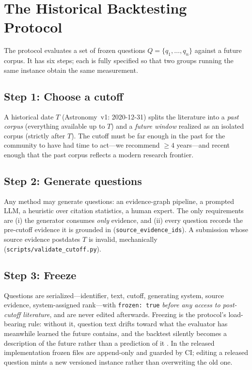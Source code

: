 \section{The Historical Backtesting Protocol}
\label{sec:protocol}

The protocol evaluates a set of frozen questions $Q = \{q_1,\dots,q_n\}$
against a future corpus. It has six steps; each is fully specified so
that two groups running the same instance obtain the same measurement.

\subsection{Step 1: Choose a cutoff}
A historical date $T$ (Astronomy~v1: 2020-12-31) splits the literature
into a \emph{past corpus} \corpusA{} (everything available up to $T$)
and a \emph{future window} realized as an isolated corpus \corpusB{}
(strictly after $T$). The cutoff must be far enough in the past for the
community to have had time to act---we recommend $\geq 4$ years---and
recent enough that the past corpus reflects a modern research frontier.

\subsection{Step 2: Generate questions}
Any method may generate questions: an evidence-graph pipeline, a
prompted LLM, a heuristic over citation statistics, a human expert. The
only requirements are (i) the generator consumes \emph{only} \corpusA{}
evidence, and (ii) every question records the pre-cutoff evidence it is
grounded in (\texttt{source\_evidence\_ids}). A submission whose source
evidence postdates $T$ is invalid, mechanically
(\texttt{scripts/validate\_cutoff.py}).

\subsection{Step 3: Freeze}
Questions are serialized---identifier, text, cutoff, generating system,
source evidence, system-assigned rank---with \texttt{frozen:\,true}
\emph{before any access to post-cutoff literature}, and are never edited
afterwards. Freezing is the protocol's load-bearing rule: without it,
question text drifts toward what the evaluator has meanwhile learned the
future contains, and the backtest silently becomes a description of the
future rather than a prediction of it \citep{bailey2014backtest}. In the
released implementation frozen files are append-only and guarded by CI;
editing a released question mints a new versioned instance rather than
overwriting the old one.

